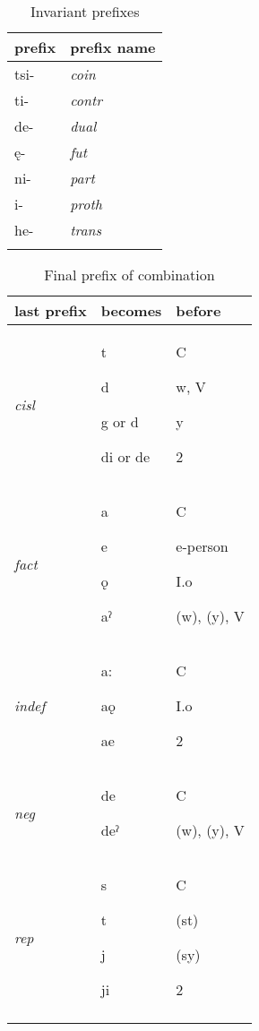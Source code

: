 \lipsum[1-1]


\begin{table}
\caption{Invariant prefixes}
\label{tab:1:invariant}
\scriptsize{
\begin{tabularx}{\textwidth}{XX}
\lsptoprule
prefix & prefix name \\
\midrule
tsi- & {\itshape coin}\\
ti- & {\itshape contr}\\
de- & {\itshape dual}\\
ę- & {\itshape fut}\\
ni- & {\itshape part}\\
i- & {\itshape proth}\\
he- & {\itshape trans}\\
\lspbottomrule
\end{tabularx}}
\end{table}





\begin{table}
\caption{Final prefix of combination}
\label{tab:1:finalsingleprefix}
\scriptsize{
\begin{tabularx}{\textwidth}{XXX}
\lsptoprule
last prefix & becomes & before\\
\midrule
{\itshape cisl} & t 

d 

g or d

di or de & C

w, V

y

2

\\
{\itshape fact} & a

e

ǫ

aˀ & C

e-person 

I.o 

(w), (y), V

\\
{\itshape indef} & a:

aǫ

ae & C

I.o 

2\\
{\itshape neg} & de

deˀ & C

(w), (y), V

\\
{\itshape rep} & s

t

j

ji & C

(st)

(sy)

2\\
\lspbottomrule
\end{tabularx}}
\end{table}



